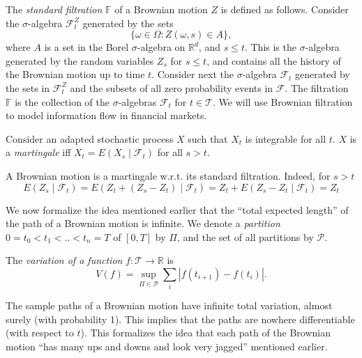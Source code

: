 \documentclass[\topdir/lecture\_notes.tex]{subfiles}
\begin{document}
The \emph{standard filtration} $\mathbb{F}$ of a Brownian motion $Z$ is defined as follows. Consider the $\sigma$-algebra $\mathcal{F}_{t}^{Z}$ generated by the sets
\begin{equation*}
\{\omega \in \Omega: Z(\omega, s) \in A\},
\end{equation*}
where $A$ is a set in the Borel $\sigma$-algebra on $\mathbb{R}^{d}$, and $s \leq t$. This is the $\sigma$-algebra generated by the random variables $Z_{s}$ for $s \leq t$, and contains all the history of the Brownian motion up to time $t$. Consider next the $\sigma$-algebra $\mathcal{F}_{t}$ generated by the sets in $\mathcal{F}_{t}^{Z}$ and the subsets of all zero probability events in $\mathcal{F}$. The filtration $\mathbb{F}$ is the collection of the $\sigma$-algebras $\mathcal{F}_{t}$ for $t \in \mathcal{T}$. We will use Brownian filtration to model information flow in financial markets.

\begin{defn}[Martingale]\label{defn:martingale}
Consider an adapted stochastic process $X$ such that $X_{t}$ is integrable for all $t$. $X$ is a \emph{martingale} iff $X_{t}=E(X_{s} \mid \mathcal{F}_{t})$ for all $s>t$.
\end{defn}

A Brownian motion is a martingale w.r.t. its standard filtration. Indeed, for $s>t$
\begin{equation*}
E(Z_{s} \mid \mathcal{F}_{t})=E(Z_{t}+(Z_{s}-Z_{t}) \mid \mathcal{F}_{t})=Z_{t}+E(Z_{s}-Z_{t} \mid \mathcal{F}_{t})=Z_{t}
\end{equation*}

We now formalize the idea mentioned earlier that the ``total expected length'' of the path of a Brownian motion is infinite. We denote a \emph{partition} $0=t_{0}<t_{1}<. .<t_{n}=T$ of $[0, T]$ by $\Pi$, and the set of all partitions by $\mathcal{P}$.
\begin{defn}\label{defn:variation}
The \emph{variation of a function} $f: \mathcal{T} \rightarrow \mathbb{R}$ is
\begin{equation*}
V(f)=\sup_{\Pi\in\mathcal{P}} \sum_{i}\left|f\left(t_{i+1}\right)-f\left(t_{i}\right)\right|.
\end{equation*}
\end{defn}
The sample paths of a Brownian motion have infinite total variation, almost surely (with probability 1). This implies that the paths are nowhere differentiable (with respect to $t$). This formalizes the idea that each path of the Brownian motion ``has many ups and downs and look very jagged'' mentioned earlier.
\end{document}
